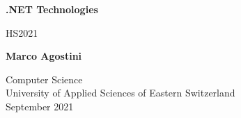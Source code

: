 \begin{titlepage}
    \begin{center}
        \vspace*{1cm}
            
        \Huge
        \textbf{.NET Technologies}
            
        \vspace{0.5cm}
        \LARGE
        HS2021
            
        \vspace{1.5cm}
            
        \textbf{Marco Agostini}
            
        \vfill
            
            
        \vspace{0.8cm}
            
            
        \Large
        Computer Science\\
        University of Applied Sciences of Eastern Switzerland\\
        September 2021
        

    \end{center}
\end{titlepage}

\tableofcontents
